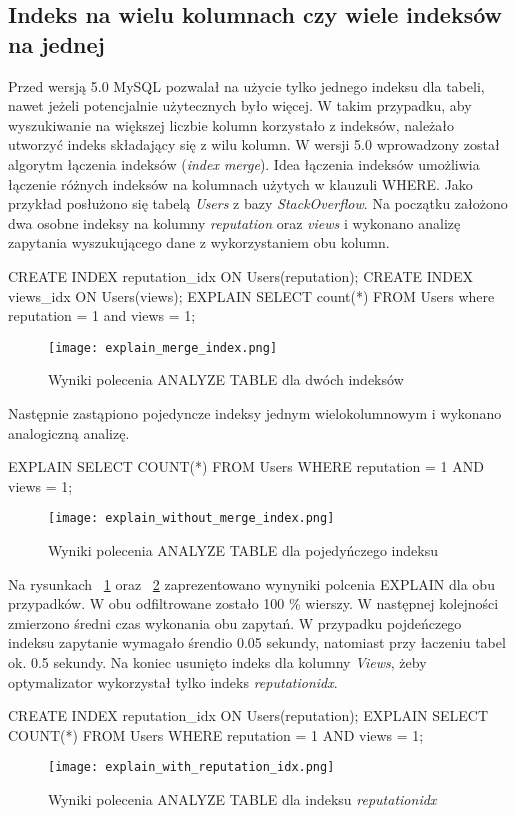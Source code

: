 \subsection{Indeks na wielu kolumnach czy wiele indeksów na jednej}
Przed wersją 5.0 MySQL pozwalał na użycie tylko jednego indeksu dla tabeli, nawet jeżeli potencjalnie użytecznych było więcej. W takim przypadku, aby wyszukiwanie na większej liczbie kolumn korzystało z indeksów, należało utworzyć indeks składający się z wilu kolumn. W wersji 5.0 wprowadzony został algorytm łączenia indeksów (\textit{index merge}). Idea łączenia indeksów umożliwia łączenie różnych indeksów na kolumnach użytych w klauzuli WHERE. Jako przykład posłużono się tabelą \textit{Users} z bazy \textit{StackOverflow}. Na początku założono dwa osobne indeksy na kolumny \textit{reputation} oraz \textit{views} i wykonano analizę zapytania wyszukującego dane z wykorzystaniem obu kolumn.
\begin{spverbatim}
	CREATE INDEX reputation_idx ON Users(reputation);
	CREATE INDEX views_idx ON Users(views);
	EXPLAIN SELECT count(*) FROM Users where reputation = 1 and views = 1;
\end{spverbatim}
\begin{figure}
	\caption{Wyniki polecenia ANALYZE TABLE dla dwóch indeksów}
	\centering
	\texttt{[image: explain\_merge\_index.png]}
	\label{fig:explain_merge_index}
\end{figure}

Następnie zastąpiono pojedyncze indeksy jednym wielokolumnowym i wykonano analogiczną analizę.
\begin{spverbatim}
	EXPLAIN SELECT COUNT(*) FROM Users WHERE reputation = 1 AND views = 1;
\end{spverbatim}

\begin{figure}
	\caption{Wyniki polecenia ANALYZE TABLE dla pojedyńczego indeksu}
	\centering
	\texttt{[image: explain\_without\_merge\_index.png]}
	\label{fig:explain_without_merge_index}
\end{figure}

Na rysunkach ~\ref{fig:explain_merge_index} oraz ~\ref{fig:explain_without_merge_index} zaprezentowano wynyniki polcenia EXPLAIN dla obu przypadków. W obu odfiltrowane zostało 100 \% wierszy. W następnej kolejności zmierzono średni czas wykonania obu zapytań. W przypadku pojdeńczego indeksu zapytanie wymagało śrendio 0.05 sekundy, natomiast przy łaczeniu tabel ok. 0.5 sekundy. Na koniec usunięto indeks dla kolumny \textit{Views}, żeby optymalizator wykorzystał tylko indeks \textit{reputation\textunderscore idx}.
\begin{spverbatim}
	CREATE INDEX reputation_idx ON Users(reputation);
	EXPLAIN SELECT COUNT(*) FROM Users WHERE reputation = 1 AND views = 1;
\end{spverbatim}
\begin{figure}
	\caption{Wyniki polecenia ANALYZE TABLE dla indeksu \textit{reputation\textunderscore idx}}
	\centering
	\texttt{[image: explain\_with\_reputation\_idx.png]}
	\label{fig:explain_with_reputation_idx}
\end{figure}

